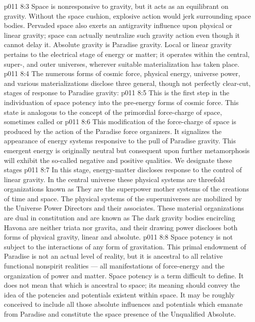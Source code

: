 \vs p011 8:3 Space is nonresponsive to gravity, but it acts as an equilibrant on gravity. Without the space cushion, explosive action would jerk surrounding space bodies. Pervaded space also exerts an antigravity influence upon physical or linear gravity; space can actually neutralize such gravity action even though it cannot delay it. Absolute gravity is Paradise gravity. Local or linear gravity pertains to the electrical stage of energy or matter; it operates within the central, super-, and outer universes, wherever suitable materialization has taken place.
\vs p011 8:4 \pc The numerous forms of cosmic force, physical energy, universe power, and various materializations disclose three general, though not perfectly clear\hyp{}cut, stages of response to Paradise gravity:
\vs p011 8:5 \bibnobreakspace {} This is the first step in the individuation of space potency into the pre\hyp{}energy forms of cosmic force. This state is analogous to the concept of the primordial force\hyp{}charge of space, sometimes called  or 
\vs p011 8:6 \bibnobreakspace {} This modification of the force\hyp{}charge of space is produced by the action of the Paradise force organizers. It signalizes the appearance of energy systems responsive to the pull of Paradise gravity. This emergent energy is originally neutral but consequent upon further metamorphosis will exhibit the so\hyp{}called negative and positive qualities. We designate these stages 
\vs p011 8:7 \bibnobreakspace {} In this stage, energy\hyp{}matter discloses response to the control of linear gravity. In the central universe these physical systems are threefold organizations known as  They are the superpower mother systems of the creations of time and space. The physical systems of the superuniverses are mobilized by the Universe Power Directors and their associates. These material organizations are dual in constitution and are known as  The dark gravity bodies encircling Havona are neither triata nor gravita, and their drawing power discloses both forms of physical gravity, linear and absolute.
\vs p011 8:8 \pc Space potency is not subject to the interactions of any form of gravitation. This primal endowment of Paradise is not an actual level of reality, but it is ancestral to all relative functional nonspirit realities --- all manifestations of force\hyp{}energy and the organization of power and matter. Space potency is a term difficult to define. It does not mean that which is ancestral to space; its meaning should convey the idea of the potencies and potentials existent within space. It may be roughly conceived to include all those absolute influences and potentials which emanate from Paradise and constitute the space presence of the Unqualified Absolute.
